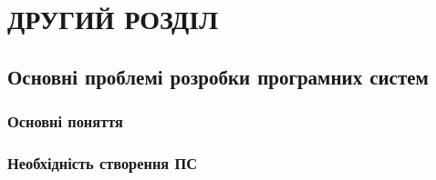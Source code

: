 ﻿\section{ДРУГИЙ РОЗДІЛ}
\subsection{Основні проблемі розробки програмних систем}
\subsubsection{Основні поняття}
\subsubsection{Необхідність створення ПС}
